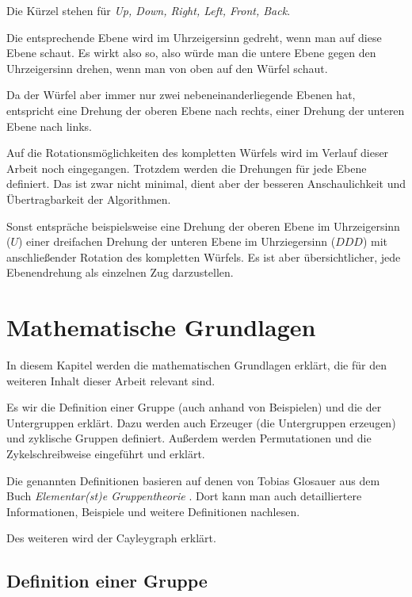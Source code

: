 \documentclass[12pt,a4paper, usenames, dvipsnames]{article}
\begin{document}
Die Kürzel stehen für \textit{Up, Down, Right, Left, Front, Back}.  


Die entsprechende Ebene wird im Uhrzeigersinn gedreht, wenn man auf diese Ebene schaut. Es wirkt also so, also würde man die untere Ebene gegen den Uhrzeigersinn drehen, wenn man von oben auf den Würfel schaut.  


Da der Würfel aber immer nur zwei nebeneinanderliegende Ebenen hat, entspricht eine Drehung der oberen Ebene nach rechts, einer Drehung der unteren Ebene nach links. 

Auf die Rotationsmöglichkeiten des kompletten Würfels wird im Verlauf dieser Arbeit noch eingegangen. Trotzdem werden die Drehungen für jede Ebene definiert. Das ist zwar nicht minimal, dient aber der besseren Anschaulichkeit und Übertragbarkeit der Algorithmen.

Sonst entspräche beispielsweise eine Drehung der oberen Ebene im Uhrzeigersinn ($U$) einer dreifachen Drehung der unteren Ebene im Uhrziegersinn ($DDD$) mit anschließender Rotation des kompletten Würfels. Es ist aber übersichtlicher, jede Ebenendrehung als einzelnen Zug darzustellen.


%
%
%
%
%
%
%
%
%
%
%
%
%
%
%
%
%


\newpage
\section{Mathematische Grundlagen}

In diesem Kapitel werden die mathematischen Grundlagen erklärt, die für den weiteren Inhalt dieser Arbeit relevant sind.

Es wir die Definition einer Gruppe (auch anhand von Beispielen) und die der Untergruppen erklärt. Dazu werden auch Erzeuger (die Untergruppen erzeugen) und zyklische Gruppen definiert. Außerdem werden Permutationen und die Zykelschreibweise eingeführt und erklärt.

Die genannten Definitionen basieren auf denen von Tobias Glosauer aus dem Buch \textit{Elementar(st)e Gruppentheorie} \cite{Buch}. Dort kann man auch detailliertere Informationen, Beispiele und weitere Definitionen nachlesen.

Des weiteren wird der Cayleygraph erklärt. 
%
%
%
%
%
%
\subsection*{Definition einer Gruppe} 
\end{document}
